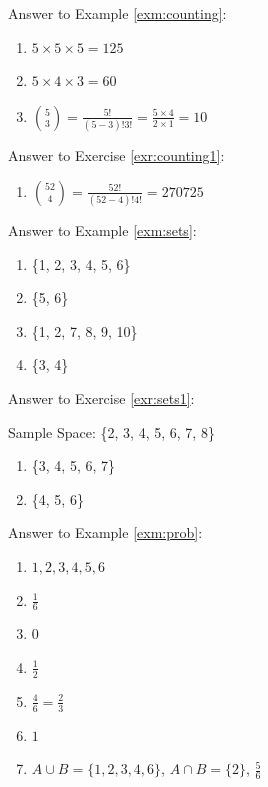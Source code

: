 \documentclass[
]{book}
\providecommand{\tightlist}{%
  \setlength{\itemsep}{0pt}\setlength{\parskip}{0pt}}
\theoremstyle{definition}
\theoremstyle{definition}
\theoremstyle{definition}
\theoremstyle{definition}
\theoremstyle{remark}
\begin{document}
Answer to Example \ref{exm:counting}:

\begin{enumerate}
\def\labelenumi{\arabic{enumi}.}
\item
  \(5 \times 5 \times 5 = 125\)
\item
  \(5 \times 4 \times 3 = 60\)
\item
  \(\binom{5}{3} = \frac{5!}{(5-3)!3!} = \frac{5 \times 4}{2 \times 1} = 10\)
\end{enumerate}

Answer to Exercise \ref{exr:counting1}:

\begin{enumerate}
\def\labelenumi{\arabic{enumi}.}
\tightlist
\item
  \(\binom{52}{4} = \frac{52!}{(52-4)!4!} = 270725\)
\end{enumerate}

Answer to Example \ref{exm:sets}:

\begin{enumerate}
\def\labelenumi{\arabic{enumi}.}
\tightlist
\item
  \{1, 2, 3, 4, 5, 6\}
\item
  \{5, 6\}
\item
  \{1, 2, 7, 8, 9, 10\}
\item
  \{3, 4\}
\end{enumerate}

Answer to Exercise \ref{exr:sets1}:

Sample Space: \{2, 3, 4, 5, 6, 7, 8\}

\begin{enumerate}
\def\labelenumi{\arabic{enumi}.}
\tightlist
\item
  \{3, 4, 5, 6, 7\}
\item
  \{4, 5, 6\}
\end{enumerate}

Answer to Example \ref{exm:prob}:

\begin{enumerate}
\def\labelenumi{\arabic{enumi}.}
\item
  \({1, 2, 3, 4, 5, 6}\)
\item
  \(\frac{1}{6}\)
\item
  \(0\)
\item
  \(\frac{1}{2}\)
\item
  \(\frac{4}{6} = \frac{2}{3}\)
\item
  \(1\)
\item
  \(A\cup B=\{1, 2, 3, 4, 6\}\), \(A\cap B=\{2\}\), \(\frac{5}{6}\)
\end{enumerate}
\end{document}
